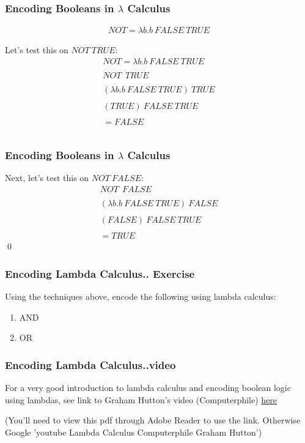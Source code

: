 \documentclass{beamer}
\begin{document}
\begin{frame}
    \frametitle{Encoding Booleans in $\lambda$ Calculus }
 \begin{eqnarray*}
NOT = \lambda b . b\  FALSE\  TRUE 
\end{eqnarray*}

Let's test this  on \alert{$NOT \ TRUE$}:
\begin{eqnarray*}
    NOT = \lambda b . b\  FALSE\  TRUE \\ \\
    NOT \ \ TRUE \\ \\
    ( \lambda b . b\  FALSE\  TRUE )\  TRUE \\ \\
    (TRUE)\  FALSE\ TRUE  \\ \\
    = FALSE  \\ \\
\end{eqnarray*}
\end{frame}
\begin{frame}
    \frametitle{Encoding Booleans in $\lambda$ Calculus }
    Next, let's test this  on \alert{$NOT \ FALSE$}:
    \begin{eqnarray*}
    NOT \ \ FALSE \\ \\
    ( \lambda b . b\  FALSE\  TRUE )\  FALSE \\ \\
    (FALSE)\  FALSE\  TRUE  \\ \\
    = TRUE
    \end{eqnarray*}
\qed
\end{frame}
\begin{frame}
  
                \frametitle{Encoding Lambda Calculus.. Exercise}
                Using the techniques above, encode the following using lambda calculus:
                \begin{enumerate}
                    \item AND 
                    \item OR 
                \end{enumerate}
            \end{frame}
\begin{frame}
  
    \frametitle{Encoding Lambda Calculus..video}
        For a very good introduction to lambda calculus and encoding boolean logic 
        using lambdas, see link to Graham Hutton's video (Computerphile) 
        \href{https://youtu.be/eis11j_iGMs}{here} 
       \\ 
       \vspace{1cm}

        (You'll need to view this pdf 
        through Adobe Reader to use the link. Otherwise Google 'youtube Lambda Calculus Computerphile Graham Hutton')
     \end{frame}
\end{document}
